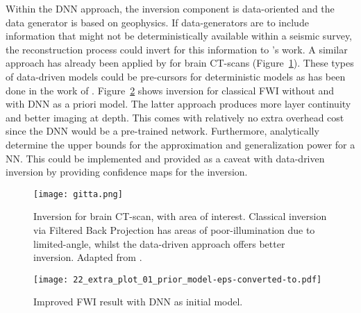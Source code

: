 
Within the DNN approach, the inversion component is data-oriented and the data generator is based on geophysics. If data-generators are to include information that might not be deterministically available within a seismic survey, the reconstruction process could invert for this information to \cite{Lewis2017}'s work. A similar approach has already been applied by \cite{Bubba2019} for brain CT-scans (Figure~\ref{fig:fwi_gitta}). These types of data-driven models could be pre-cursors for deterministic models as has been done in the work of \cite{Araya-Polo2018}. Figure~\ref{fig:dnn_initial_fwi} shows inversion for classical FWI without and with DNN as a priori model. The latter approach produces more layer continuity and better imaging at depth. This comes with relatively no extra overhead cost since the DNN would be a pre-trained network. Furthermore, \cite{Grohs2019} analytically determine the upper bounds for the approximation and generalization power for a NN. This could be implemented and provided as a caveat with data-driven inversion by providing confidence maps for the inversion.

\begin{figure}[ht!]
    \centering
    \texttt{[image: gitta.png]}
    \caption[Data-driven inversion for CT-scans.]{Inversion for brain CT-scan, with area of interest. Classical inversion via Filtered Back Projection has areas of poor-illumination due to limited-angle, whilst the data-driven approach offers better inversion. Adapted from \cite{Bubba2019}.}
    \label{fig:fwi_gitta}
\end{figure}

\begin{figure}[ht!]
    \centering
    \texttt{[image: 22\_extra\_plot\_01\_prior\_model-eps-converted-to.pdf]}
    \caption[Improved FWI result with DNN as initial model]{Improved FWI result with DNN as initial model.}
    \label{fig:dnn_initial_fwi}
\end{figure}

